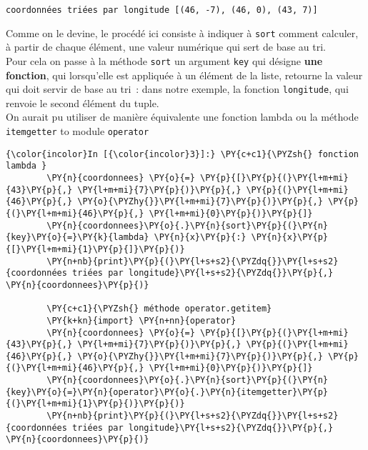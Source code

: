     \begin{Verbatim}[commandchars=\\\{\}]
coordonnées triées par longitude [(46, -7), (46, 0), (43, 7)]

    \end{Verbatim}

    Comme on le devine, le procédé ici consiste à indiquer à \texttt{sort}
comment calculer, à partir de chaque élément, une valeur numérique qui
sert de base au tri.\\

Pour cela on passe à la méthode \texttt{sort} un argument \texttt{key}
qui désigne \textbf{une fonction}, qui lorsqu'elle est appliquée à un
élément de la liste, retourne la valeur qui doit servir de base au tri~:
dans notre exemple, la fonction \texttt{longitude}, qui renvoie le
second élément du tuple.\\

    On aurait pu utiliser de manière équivalente une fonction lambda ou la
méthode \texttt{itemgetter} to module \texttt{operator}

    \begin{Verbatim}[commandchars=\\\{\}]
{\color{incolor}In [{\color{incolor}3}]:} \PY{c+c1}{\PYZsh{} fonction lambda }
        \PY{n}{coordonnees} \PY{o}{=} \PY{p}{[}\PY{p}{(}\PY{l+m+mi}{43}\PY{p}{,} \PY{l+m+mi}{7}\PY{p}{)}\PY{p}{,} \PY{p}{(}\PY{l+m+mi}{46}\PY{p}{,} \PY{o}{\PYZhy{}}\PY{l+m+mi}{7}\PY{p}{)}\PY{p}{,} \PY{p}{(}\PY{l+m+mi}{46}\PY{p}{,} \PY{l+m+mi}{0}\PY{p}{)}\PY{p}{]}
        \PY{n}{coordonnees}\PY{o}{.}\PY{n}{sort}\PY{p}{(}\PY{n}{key}\PY{o}{=}\PY{k}{lambda} \PY{n}{x}\PY{p}{:} \PY{n}{x}\PY{p}{[}\PY{l+m+mi}{1}\PY{p}{]}\PY{p}{)}
        \PY{n+nb}{print}\PY{p}{(}\PY{l+s+s2}{\PYZdq{}}\PY{l+s+s2}{coordonnées triées par longitude}\PY{l+s+s2}{\PYZdq{}}\PY{p}{,} \PY{n}{coordonnees}\PY{p}{)}
        
        \PY{c+c1}{\PYZsh{} méthode operator.getitem}
        \PY{k+kn}{import} \PY{n+nn}{operator}
        \PY{n}{coordonnees} \PY{o}{=} \PY{p}{[}\PY{p}{(}\PY{l+m+mi}{43}\PY{p}{,} \PY{l+m+mi}{7}\PY{p}{)}\PY{p}{,} \PY{p}{(}\PY{l+m+mi}{46}\PY{p}{,} \PY{o}{\PYZhy{}}\PY{l+m+mi}{7}\PY{p}{)}\PY{p}{,} \PY{p}{(}\PY{l+m+mi}{46}\PY{p}{,} \PY{l+m+mi}{0}\PY{p}{)}\PY{p}{]}
        \PY{n}{coordonnees}\PY{o}{.}\PY{n}{sort}\PY{p}{(}\PY{n}{key}\PY{o}{=}\PY{n}{operator}\PY{o}{.}\PY{n}{itemgetter}\PY{p}{(}\PY{l+m+mi}{1}\PY{p}{)}\PY{p}{)}
        \PY{n+nb}{print}\PY{p}{(}\PY{l+s+s2}{\PYZdq{}}\PY{l+s+s2}{coordonnées triées par longitude}\PY{l+s+s2}{\PYZdq{}}\PY{p}{,} \PY{n}{coordonnees}\PY{p}{)}
\end{Verbatim}


